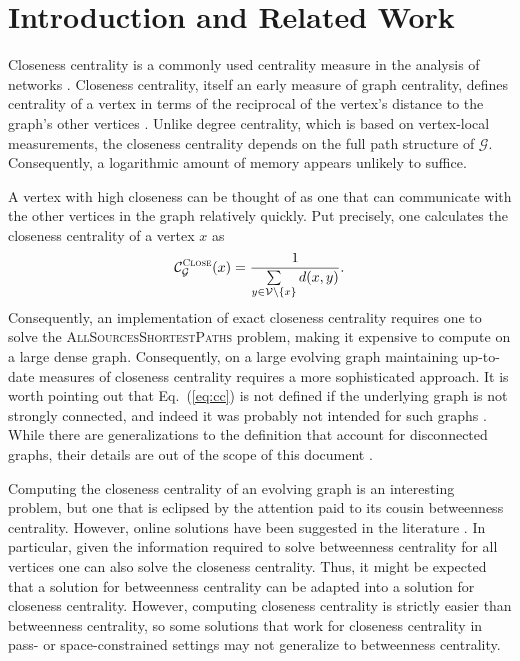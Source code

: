 \documentclass[10]{report}
\newcommand{\algoname}[1]{\textnormal{\textsc{#1}}}
\begin{document}
\section{Introduction and Related Work} \label{cc:sec:intro}

Closeness centrality is a commonly used centrality measure in the analysis of networks \cite{bavelas1948mathematical, wasserman1994social, boldi2014axioms, cohen2014computing, wei2014real}.
Closeness centrality, itself an early measure of graph centrality, defines centrality of a vertex in terms of the reciprocal of the vertex's distance to the graph's other vertices \cite{boldi2014axioms}. 
Unlike degree centrality, which is based on vertex-local measurements, the closeness centrality depends on the full path structure of $\mathcal{G}$.
Consequently, a logarithmic amount of memory appears unlikely to suffice.


A vertex with high closeness can be thought of as one that can communicate with the other vertices in the graph relatively quickly. 
Put precisely, one calculates the closeness centrality of a vertex $x$ as
%
\begin{equation} \label{eq:cc}
\mathcal{C}^{\algoname{Close}}_{\mathcal{G}}(x) = \frac{1}{\sum\limits_{y \in \mathcal{V} \setminus \{x\}} d(x,y)}.
\end{equation}
%
Consequently, an implementation of exact closeness centrality requires one to solve the \algoname{AllSourcesShortestPaths} problem, making it  expensive to compute on a large dense graph.
Consequently, on a large evolving graph maintaining up-to-date measures of closeness centrality requires a more sophisticated approach. 
It is worth pointing out that Eq.~(\ref{eq:cc}) is not defined if the underlying graph is not strongly connected, and indeed it was probably not intended for such graphs \cite{boldi2014axioms}. 
While there are generalizations to the definition that account for disconnected graphs, their details are out of the scope of this document .

Computing the closeness centrality of an evolving graph is an interesting problem, but one that is eclipsed by the attention paid to its cousin betweenness centrality.
However, online solutions have been suggested in the literature \cite{wei2014real}. 
In particular, given the information required to solve betweenness centrality for all vertices one can also solve the closeness centrality.
Thus, it might be expected that a solution for betweenness centrality can be adapted into a solution for closeness centrality. 
However, computing closeness centrality is strictly easier than betweenness centrality, so some solutions that work for closeness centrality in pass- or space-constrained settings may not generalize to betweenness centrality.
\end{document}
